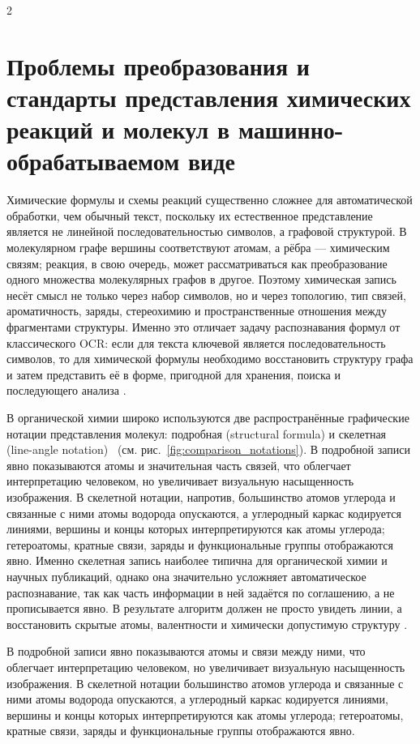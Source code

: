 \documentclass[11pt]{article}
\begin{document}
\begin{multicols}{2}
\section{Проблемы преобразования и стандарты представления химических реакций и молекул в машинно-обрабатываемом виде}
Химические формулы и схемы реакций существенно сложнее для автоматической обработки, чем обычный текст, поскольку их естественное представление является не линейной последовательностью символов, а графовой структурой. В молекулярном графе вершины соответствуют атомам, а рёбра — химическим связям; реакция, в свою очередь, может рассматриваться как преобразование одного множества молекулярных графов в другое. Поэтому химическая запись несёт смысл не только через набор символов, но и через топологию, тип связей, ароматичность, заряды, стереохимию и пространственные отношения между фрагментами структуры. Именно это отличает задачу распознавания формул от классического OCR: если для текста ключевой является последовательность символов, то для химической формулы необходимо восстановить структуру графа и затем представить её в форме, пригодной для хранения, поиска и последующего анализа \cite{refTrinajstic,refWarr}.

В органической химии широко используются две распространённые графические нотации представления молекул: подробная (structural formula) и скелетная (line-angle notation)~\cite{refLineAngle} (см. рис.~\ref{fig:comparison_notations}). В подробной записи явно показываются атомы и значительная часть связей, что облегчает интерпретацию человеком, но увеличивает визуальную насыщенность изображения. В скелетной нотации, напротив, большинство атомов углерода и связанные с ними атомы водорода опускаются, а углеродный каркас кодируется линиями, вершины и концы которых интерпретируются как атомы углерода; гетероатомы, кратные связи, заряды и функциональные группы отображаются явно. Именно скелетная запись наиболее типична для органической химии и научных публикаций, однако она значительно усложняет автоматическое распознавание, так как часть информации в ней задаётся по соглашению, а не прописывается явно. В результате алгоритм должен не просто увидеть линии, а восстановить скрытые атомы, валентности и химически допустимую структуру \cite{refWarr}.

 В подробной записи явно показываются атомы и связи между ними, что облегчает интерпретацию человеком, но увеличивает визуальную насыщенность изображения. В скелетной нотации большинство атомов углерода и связанные с ними атомы водорода опускаются, а углеродный каркас кодируется линиями, вершины и концы которых интерпретируются как атомы углерода; гетероатомы, кратные связи, заряды и функциональные группы отображаются явно.


\end{multicols}
\end{document}
